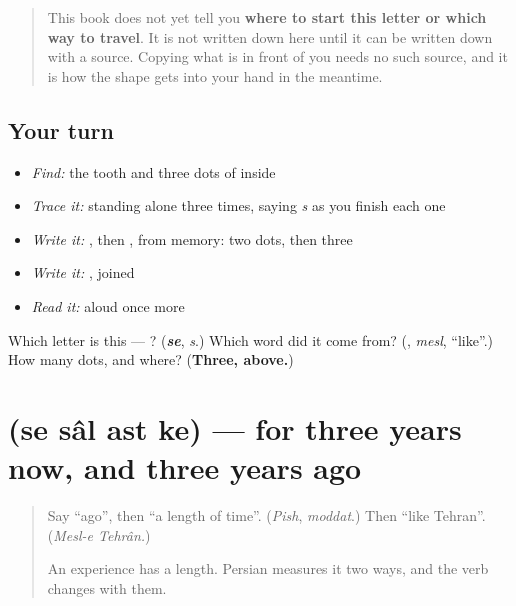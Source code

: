\begin{quote}
This book does not yet tell you \textbf{where to start this letter or which way to travel}. It is not written down here until it can be written down with a source. Copying what is in front of you needs no such source, and it is how the shape gets into your hand in the meantime.
\end{quote}

\subsection*{Your turn}
\begin{itemize}
\raggedright
  \item \emph{Find:} the tooth and three dots of  inside \textbf{}
  \item \emph{Trace it:}  standing alone three times, saying \emph{s} as you finish each one
  \item \emph{Write it:} , then , from memory: two dots, then three
  \item \emph{Write it:} \textbf{}, joined
  \item \emph{Read it:} \textbf{} aloud once more
\end{itemize}

\begin{tcolorbox}[breakable,colback=teal!4,colframe=teal!35!black,title={Before you move on}]
Which letter is this — ? (\emph{\textbf{se}}, \emph{s}.) Which word did it come from? (\textbf{}, \emph{mesl}, \textquotedblleft{}like\textquotedblright{}.) How many dots, and where? (\textbf{Three, above.})
\end{tcolorbox}
\section[\texorpdfstring{\fa{سه} \fa{سال} \fa{است} \fa{که} (se sâl ast ke)}{سه سال است که (se sâl ast ke)}]{    (se sâl ast ke) — for three years now, and three years ago}

\label{lesson:FA-C297-se-sal-ast-ke}



\begin{quote}
Say \textquotedblleft{}ago\textquotedblright{}, then \textquotedblleft{}a length of time\textquotedblright{}. (\emph{Pish}, \emph{moddat}.) Then \textquotedblleft{}like Tehran\textquotedblright{}. (\emph{Mesl-e Tehrân.})

An experience has a length. Persian measures it two ways, and the verb changes with them.
\end{quote}

